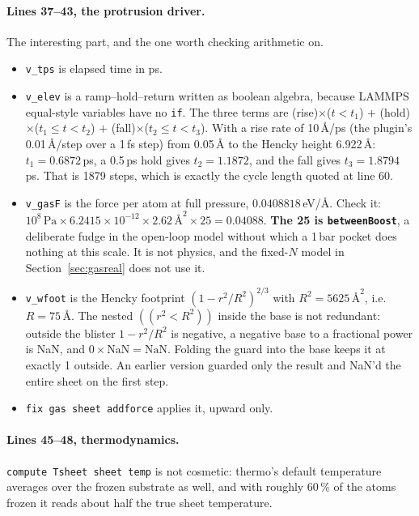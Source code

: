 \documentclass[11pt,a4paper]{article}
\begin{document}
\paragraph{Lines 37--43, the protrusion driver.} The interesting part, and the
one worth checking arithmetic on.
\begin{itemize}
\item \texttt{v\_tps} is elapsed time in ps.
\item \texttt{v\_elev} is a ramp--hold--return written as boolean algebra,
      because LAMMPS equal-style variables have no \texttt{if}. The three terms
      are (rise)$\times$($t<t_1$) $+$ (hold)$\times$($t_1\le t<t_2$) $+$
      (fall)$\times$($t_2\le t<t_3$). With a rise rate of 10\,\AA/ps (the
      plugin's 0.01\,\AA/step over a 1\,fs step) from 0.05\,\AA{} to the Hencky
      height 6.922\,\AA{}: $t_1 = 0.6872$\,ps, a 0.5\,ps hold gives
      $t_2 = 1.1872$, and the fall gives $t_3 = 1.8794$\,ps. That is 1879 steps,
      which is exactly the cycle length quoted at line 60.
\item \texttt{v\_gasF} is the force per atom at full pressure,
      $0.0408818$\,eV/\AA. Check it:
      $10^{8}\,\mathrm{Pa} \times 6.2415\times10^{-12} \times 2.62\,\text{\AA}^2
      \times 25 = 0.04088$. \textbf{The 25 is \texttt{betweenBoost}}, a
      deliberate fudge in the open-loop model without which a 1\,bar pocket
      does nothing at this scale. It is not physics, and the fixed-$N$ model in
      Section~\ref{sec:gasreal} does not use it.
\item \texttt{v\_wfoot} is the Hencky footprint $(1-r^2/R^2)^{2/3}$ with
      $R^2 = 5625\,\text{\AA}^2$, i.e. $R = 75$\,\AA. The nested
      $((r^2<R^2))$ inside the base is not redundant: outside the blister
      $1-r^2/R^2$ is negative, a negative base to a fractional power is NaN, and
      $0\times\mathrm{NaN}=\mathrm{NaN}$. Folding the guard into the base keeps
      it at exactly 1 outside. An earlier version guarded only the result and
      NaN'd the entire sheet on the first step.
\item \texttt{fix gas sheet addforce} applies it, upward only.
\end{itemize}

\paragraph{Lines 45--48, thermodynamics.} \texttt{compute Tsheet sheet temp} is
not cosmetic: thermo's default temperature averages over the frozen substrate
as well, and with roughly 60\,\% of the atoms frozen it reads about half the
true sheet temperature.
\end{document}
